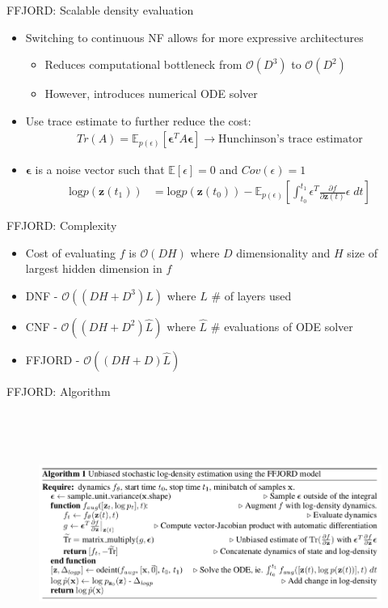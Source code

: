 \begin{frame}{FFJORD: Scalable density evaluation}
\begin{itemize}
    \item Switching to continuous NF allows for more expressive architectures
    \begin{itemize}
        \item Reduces computational bottleneck from $\mathcal{O}(D^3)$ to $\mathcal{O}(D^2)$
        \item However, introduces numerical ODE solver
    \end{itemize}
    \item Use trace estimate to further reduce the cost:
    \begin{align*}
        Tr(A) = \mathbb{E}_{p(\epsilon)}[\mathbf{\epsilon}^T A \mathbf{\epsilon}] \longrightarrow \text{Hunchinson's trace estimator}
    \end{align*}
    \item $\mathbf{\epsilon}$ is a noise vector such that $\mathbb{E}[\epsilon] = 0$ and $Cov(\epsilon) = 1$
    \begin{align*}
        \text{log} p(\mathbf{z}(t_1)) &= \text{log} p(\mathbf{z}(t_0)) - \mathbb{E}_{p(\epsilon)}[\int^{t_1}_{t_0} \epsilon^T \frac{\partial f}{\partial \mathbf{z}(t)} \epsilon \; dt]
    \end{align*}
\end{itemize}
\end{frame}
\begin{frame}{FFJORD: Complexity}
\begin{itemize}
    \item Cost of evaluating $f$ is $\mathcal{O}(DH)$ where $D$ dimensionality and $H$ size of largest hidden dimension in $f$
    \item DNF - $\mathcal{O}((DH+D^3)L)$ where $L$ \# of layers used
    \item CNF - $\mathcal{O}((DH+D^2)\hat{L})$ where $\hat{L}$ \# evaluations of ODE solver
    \item FFJORD - $\mathcal{O}((DH+D)\hat{L})$
\end{itemize}
\end{frame}
\begin{frame}{FFJORD: Algorithm}
\begin{figure}
    \centering
    \includegraphics[width=\textwidth, height=8cm,keepaspectratio]{images/ffjord_algorithm.png}
    \label{fig:ffjord_experiments1}
\end{figure}
\end{frame}
